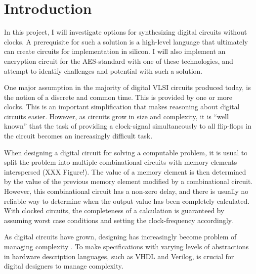 \section{Introduction}

In this project, I will investigate options for synthesizing digital
circuits without clocks. A prerequisite for such a solution is a
high-level language that ultimately can create circuits for
implementation in silicon. I will also implement an encryption circuit
for the AES-standard with one of these technologies, and attempt to
identify challenges and potential with such a solution.

One major assumption in the majority of digital VLSI circuits produced
today, is the notion of a discrete and common time. This is provided
by one or more clocks. This is an important simplification that makes
reasoning about digital circuits easier. However, as circuits grow in
size and complexity, it is ``well known'' \cite[pp. 5]{sparso} that
the task of providing a clock-signal simultaneously to all flip-flops
in the circuit becomes an increasingly difficult task.

When designing a digital circuit for solving a computable problem, it
is usual to split the problem into multiple combinational circuits
with memory elements interspersed (XXX Figure!). The value of a memory
element is then determined by the value of the previous memory element
modified by a combinational circuit. However, this combinational
circuit has a non-zero delay, and there is usually no reliable way to
determine when the output value has been completely calculated. With
clocked circuits, the completeness of a calculation is guaranteed by
assuming worst case conditions and setting the clock-frequency
accordingly.

As digital circuits have grown, designing has increasingly become
problem of managing complexity \cite{flynn2009deep}. To make
specifications with varying levels of abstractions in hardware
description languages, such as VHDL and Verilog, is crucial for
digital designers to manage complexity.


